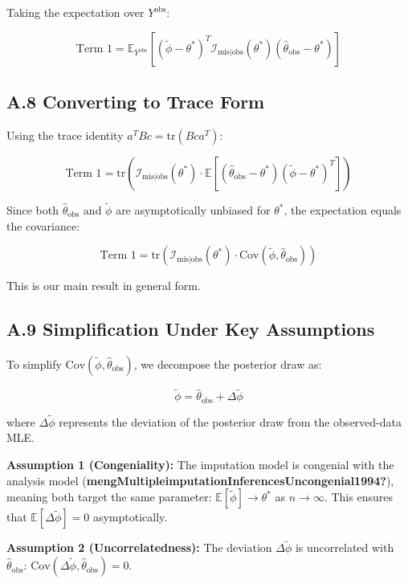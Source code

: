 \documentclass[
]{article}
\begin{document}
Taking the expectation over \(Y^{\text{obs}}\):

\[\text{Term 1} = \mathbb{E}_{Y^{\text{obs}}}\left[(\tilde{\phi} - \theta^*)^T \mathcal{I}_{\text{mis}|\text{obs}}(\theta^*)(\hat{\theta}_{\text{obs}} - \theta^*)\right]\]

\subsection{A.8 Converting to Trace
Form}\label{a.8-converting-to-trace-form}

Using the trace identity \(a^T B c = \text{tr}(B c a^T)\):

\[\text{Term 1} = \text{tr}\left(\mathcal{I}_{\text{mis}|\text{obs}}(\theta^*) \cdot \mathbb{E}[(\hat{\theta}_{\text{obs}} - \theta^*)(\tilde{\phi} - \theta^*)^T]\right)\]

Since both \(\hat{\theta}_{\text{obs}}\) and \(\tilde{\phi}\) are
asymptotically unbiased for \(\theta^*\), the expectation equals the
covariance:

\[\text{Term 1} = \text{tr}\left(\mathcal{I}_{\text{mis}|\text{obs}}(\theta^*) \cdot \text{Cov}(\tilde{\phi}, \hat{\theta}_{\text{obs}})\right)\]

This is our main result in general form.

\subsection{A.9 Simplification Under Key
Assumptions}\label{a.9-simplification-under-key-assumptions}

To simplify \(\text{Cov}(\tilde{\phi}, \hat{\theta}_{\text{obs}})\), we
decompose the posterior draw as:

\[\tilde{\phi} = \hat{\theta}_{\text{obs}} + \Delta\tilde{\phi}\]

where \(\Delta\tilde{\phi}\) represents the deviation of the posterior
draw from the observed-data MLE.

\textbf{Assumption 1 (Congeniality):} The imputation model is congenial
with the analysis model
(\textbf{mengMultipleimputationInferencesUncongenial1994?}), meaning
both target the same parameter:
\(\mathbb{E}[\tilde{\phi}] \to \theta^*\) as \(n \to \infty\). This
ensures that \(\mathbb{E}[\Delta\tilde{\phi}] = 0\) asymptotically.

\textbf{Assumption 2 (Uncorrelatedness):} The deviation
\(\Delta\tilde{\phi}\) is uncorrelated with
\(\hat{\theta}_{\text{obs}}\):
\(\text{Cov}(\Delta\tilde{\phi}, \hat{\theta}_{\text{obs}}) = 0\).
\end{document}
